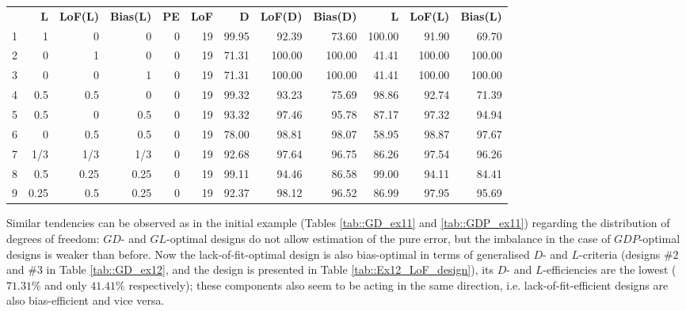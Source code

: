 \begin{table}[h]
{\begin{tabular}{rrrrrrrrrrrr}
   & \textbf{L}       & \textbf{LoF(L)}    & \textbf{Bias(L)}   & \textbf{PE}        & \textbf{LoF}        & \textbf{D}   & \textbf{LoF(D)}   & \textbf{Bias(D)}  & \textbf{L}       & \textbf{LoF(L)}   & \textbf{Bias(L)}  \\
1 & 1 & 0 & 0 & \multicolumn{1}{|r}{0} & 19 & \multicolumn{1}{|r}{99.95} & 92.39 & 73.60 & \multicolumn{1}{|r}{100.00} & 91.90 & 69.70 \\
2 & 0 & 1 & 0 & \multicolumn{1}{|r}{0} & 19 & \multicolumn{1}{|r}{71.31} & 100.00 & 100.00 & \multicolumn{1}{|r}{41.41} & 100.00 & 100.00 \\
3 & 0 & 0 & 1 & \multicolumn{1}{|r}{0} & 19 & \multicolumn{1}{|r}{71.31} & 100.00 & 100.00 & \multicolumn{1}{|r}{41.41} & 100.00 & 100.00 \\
4 & 0.5 & 0.5 & 0 & \multicolumn{1}{|r}{0} & 19 & \multicolumn{1}{|r}{99.32} & 93.23 & 75.69 & \multicolumn{1}{|r}{98.86} & 92.74 & 71.39 \\
5 & 0.5 & 0 & 0.5 & \multicolumn{1}{|r}{0} & 19 & \multicolumn{1}{|r}{93.32} & 97.46 & 95.78 & \multicolumn{1}{|r}{87.17} & 97.32 & 94.94 \\
6 & 0 & 0.5 & 0.5 & \multicolumn{1}{|r}{0} & 19 & \multicolumn{1}{|r}{78.00} & 98.81 & 98.07 & \multicolumn{1}{|r}{58.95} & 98.87 & 97.67 \\
7 & 1/3 & 1/3 & 1/3 & \multicolumn{1}{|r}{0} & 19 & \multicolumn{1}{|r}{92.68} & 97.64 & 96.75 & \multicolumn{1}{|r}{86.26} & 97.54 & 96.26 \\
8 & 0.5 & 0.25 & 0.25 & \multicolumn{1}{|r}{0} & 19 & \multicolumn{1}{|r}{99.11} & 94.46 & 86.58 & \multicolumn{1}{|r}{99.00} & 94.11 & 84.41 \\
9 & 0.25 & 0.5 & 0.25 & \multicolumn{1}{|r}{0} & 19 & \multicolumn{1}{|r}{92.37} & 98.12 & 96.52 & \multicolumn{1}{|r}{86.99} & 97.95 & 95.69 
\end{tabular}
}
\end{table}

Similar tendencies can be observed as in the initial example (Tables \ref{tab::GD_ex11} and \ref{tab::GDP_ex11}) regarding the distribution of degrees of freedom: $GD$- and $GL$-optimal designs do not allow estimation of the pure error, but the imbalance in the case of $GDP$-optimal designs is weaker than before. Now the lack-of-fit-optimal design is also bias-optimal in terms of generalised $D$- and $L$-criteria (designs \#$2$ and \#$3$ in Table \ref{tab::GD_ex12}, and the design is presented in Table \ref{tab::Ex12_LoF_design}), its $D$- and $L$-efficiencies are the lowest ($71.31\%$ and only $41.41\%$ respectively); these components also seem to be acting in the same direction, i.e. lack-of-fit-efficient designs are also bias-efficient and vice versa. 

